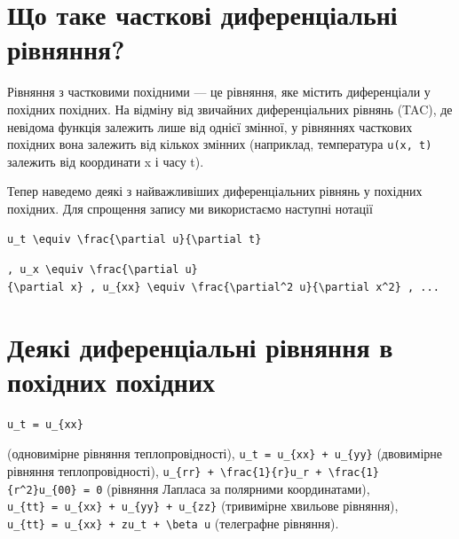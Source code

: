 \documentclass[
  ukrainian,
]{article}
\begin{document}
\section{Що таке часткові диференціальні
рівняння?}\label{ux449ux43e-ux442ux430ux43aux435-ux447ux430ux441ux442ux43aux43eux432ux456-ux434ux438ux444ux435ux440ux435ux43dux446ux456ux430ux43bux44cux43dux456-ux440ux456ux432ux43dux44fux43dux43dux44f}

Рівняння з частковими похідними --- це рівняння, яке містить
диференціали у похідних похідних. На відміну від звичайних
диференціальних рівнянь (TAC), де невідома функція залежить лише від
однієї змінної, у рівняннях часткових похідних вона залежить від кількох
змінних (наприклад, температура \texttt{u(x,\ t)} залежить від
координати x і часу t).

Тепер наведемо деякі з найважливіших диференціальних рівнянь у похідних
похідних. Для спрощення запису ми використаємо наступні нотації

\begin{verbatim}
u_t \equiv \frac{\partial u}{\partial t}
\end{verbatim}

\texttt{,\ \textquotesingle{}u\_x\ \textbackslash{}equiv\ \textbackslash{}frac\{\textbackslash{}partial\ u\}\{\textbackslash{}partial\ x\}\textquotesingle{}\ ,\ \textquotesingle{}u\_\{xx\}\ \textbackslash{}equiv\ \textbackslash{}frac\{\textbackslash{}partial\^{}2\ u\}\{\textbackslash{}partial\ x\^{}2\}\textquotesingle{}\ ,\ ...}

\section{Деякі диференціальні рівняння в похідних
похідних}\label{ux434ux435ux44fux43aux456-ux434ux438ux444ux435ux440ux435ux43dux446ux456ux430ux43bux44cux43dux456-ux440ux456ux432ux43dux44fux43dux43dux44f-ux432-ux43fux43eux445ux456ux434ux43dux438ux445-ux43fux43eux445ux456ux434ux43dux438ux445}

\begin{verbatim}
u_t = u_{xx}
\end{verbatim}

(одновимірне рівняння теплопровідності),
\texttt{u\_t\ =\ u\_\{xx\}\ +\ u\_\{yy\}} (двовимірне рівняння
теплопровідності),
\texttt{u\_\{rr\}\ +\ \textbackslash{}frac\{1\}\{r\}u\_r\ +\ \textbackslash{}frac\{1\}\{r\^{}2\}u\_\{00\}\ =\ 0}
(рівняння Лапласа за полярними координатами),
\texttt{u\_\{tt\}\ =\ u\_\{xx\}\ +\ u\_\{yy\}\ +\ u\_\{zz\}} (тривимірне
хвильове рівняння),
\texttt{u\_\{tt\}\ =\ u\_\{xx\}\ +\ zu\_t\ +\ \textbackslash{}beta\ u}
(телеграфне рівняння).
\end{document}

